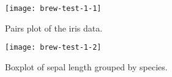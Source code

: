 \documentclass[a4paper]{article}
\begin{document}
\begin{figure}[htbp]
  \begin{center}
\texttt{[image: brew-test-1-1]}
    \caption{Pairs plot of the iris data.}
  \end{center}
\end{figure}


\begin{figure}[htbp]
  \begin{center}
\texttt{[image: brew-test-1-2]}
    \caption{Boxplot of sepal length grouped by species.}
  \end{center}
\end{figure}
\end{document}

